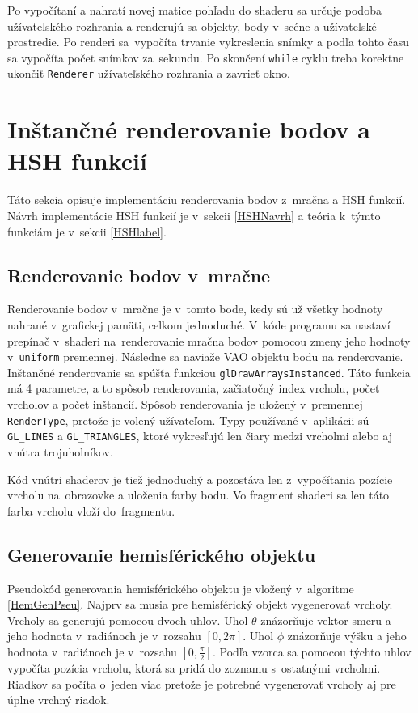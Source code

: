 Po vypočítaní a nahratí novej matice pohľadu do shaderu sa určuje podoba užívatelského rozhrania a renderujú sa objekty, body v~scéne a užívatelské prostredie. Po renderi sa~vypočíta trvanie vykreslenia snímky a podľa tohto času sa vypočíta počet snímkov za~sekundu. Po skončení \verb|while| cyklu treba korektne ukončiť \verb|Renderer| užívateľského rozhrania a zavrieť okno.

\section{Inštančné renderovanie bodov a HSH funkcií}
\label{HSHImpl}
Táto sekcia opisuje implementáciu renderovania bodov z~mračna a HSH funkcií. Návrh implementácie HSH funkcií je v~sekcii \ref{HSHNavrh} a teória k~týmto funkciám je v~sekcii \ref{HSHlabel}.

\subsection*{Renderovanie bodov v~mračne}
Renderovanie bodov v~mračne je v~tomto bode, kedy sú už všetky hodnoty nahrané v~grafickej pamäti, celkom jednoduché. V~kóde programu sa nastaví prepínač v~shaderi na~renderovanie mračna bodov pomocou zmeny jeho hodnoty v~\verb|uniform| premennej. Následne sa naviaže VAO objektu bodu na renderovanie. Inštančné renderovanie sa spúšťa funkciou \verb|glDrawArraysInstanced|. Táto funkcia má 4 parametre, a to spôsob renderovania, začiatočný index vrcholu, počet vrcholov a počet inštancií. Spôsob renderovania je uložený v~premennej \verb|RenderType|, pretože je volený užívateľom. Typy používané v~aplikácii sú \verb|GL_LINES| a \verb|GL_TRIANGLES|, ktoré vykresľujú len čiary medzi vrcholmi alebo aj vnútra trojuholníkov.

Kód vnútri shaderov je tiež jednoduchý a pozostáva len z~vypočítania pozície vrcholu na~obrazovke a uloženia farby bodu. Vo fragment shaderi sa len táto farba vrcholu vloží do~fragmentu.

\subsection*{Generovanie hemisférického objektu}
Pseudokód generovania hemisférického objektu je vložený v~algoritme \ref{HemGenPseu}. Najprv sa musia pre hemisférický objekt vygenerovať vrcholy. Vrcholy sa generujú pomocou dvoch uhlov. Uhol $\theta$ znázorňuje vektor smeru a jeho hodnota v~radiánoch je v~rozsahu $[0, 2\pi]$. Uhol $\phi$ znázorňuje výšku a jeho hodnota v~radiánoch je v~rozsahu $[0, \frac{\pi}{2}]$. Podľa vzorca sa pomocou týchto uhlov vypočíta pozícia vrcholu, ktorá sa pridá do zoznamu s~ostatnými vrcholmi. Riadkov sa počíta o~jeden viac pretože je potrebné vygenerovať vrcholy aj pre úplne vrchný riadok.

